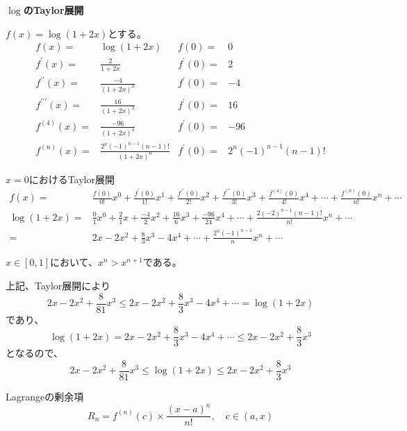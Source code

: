 \documentclass[12pt,b5paper]{ltjsarticle}
\begin{document}
\hrulefill

\textbf{$\log$のTaylor展開}

$f(x)=\log(1+2x)$とする。
\begin{align}
 f(x) =& \log(1+2x) & f(0) =& 0\\
 f^{\prime}(x) =& \frac{2}{1+2x} & f^{\prime}(0) =& 2\\
 f^{\prime\prime}(x) =& \frac{-4}{(1+2x)^2} & f^{\prime}(0) =& -4\\
 f^{\prime\prime\prime}(x) =& \frac{16}{(1+2x)^3} & f^{\prime}(0) =& 16\\
 f^{(4)}(x) =& \frac{-96}{(1+2x)^4} & f^{\prime}(0) =& -96\\
 f^{(n)}(x) =& \frac{2^n(-1)^{n-1}(n-1)!}{(1+2x)^n} & f^{\prime}(0) =& 2^n(-1)^{n-1}(n-1)!
\end{align}

$x=0$におけるTaylor展開
\begin{align}
 f(x) =& \frac{f(0)}{0!}x^0 + \frac{f^{\prime}(0)}{1!}x^1 + \frac{f^{\prime\prime}(0)}{2!}x^2 + 
   \frac{f^{\prime\prime\prime}(0)}{3!}x^3 + \frac{f^{(4)}(0)}{4!}x^4 +
   \cdots + \frac{f^{(n)}(0)}{n!}x^n + \cdots\\
 \log(1+2x) =& \frac{0}{1}x^0 + \frac{2}{1}x + \frac{-4}{2}x^2 + \frac{16}{6}x^3 +
   \frac{-96}{24}x^4 + \cdots + \frac{2(-2)^{n-1}(n-1)!}{n!}x^n + \cdots \\
 =& 2x-2x^2+\frac{8}{3}x^3 - 4x^4 + \cdots + \frac{2^n(-1)^{n-1}}{n}x^n + \cdots
\end{align}


$x\in [0,1]$において、$x^n > x^{n+1}$である。

上記、Taylor展開により
\begin{equation}
 2x-2x^2+\frac{8}{81}x^3
  \leq
  2x-2x^2+\frac{8}{3}x^3 - 4x^4 + \cdots
  = \log(1+2x)
  \label{low}
\end{equation}
であり、
\begin{equation}
 \log(1+2x)
  = 2x-2x^2+\frac{8}{3}x^3 - 4x^4 + \cdots
  \leq
  2x-2x^2+\frac{8}{3}x^3
  \label{hi}
\end{equation}
となるので、
\begin{equation}
  2x-2x^2+\frac{8}{81}x^3
 \leq
 \log(1+2x)
 \leq
  2x-2x^2+\frac{8}{3}x^3
\end{equation}

\hrulefill

Lagrangeの剰余項
\begin{equation}
 R_n=f^{(n)}(c)\times \frac{(x-a)^n}{n!} ,\quad c\in(a,x)
\end{equation}
\end{document}
